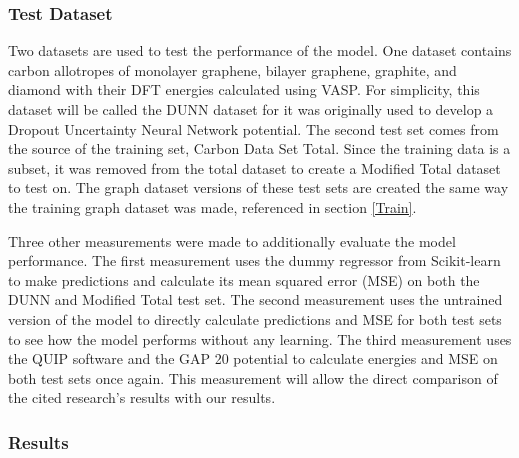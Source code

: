 \documentclass[12pt, abstract = true]{scrartcl}
\begin{document}
\subsubsection{Test Dataset} 
Two datasets are used to test the performance of the model. One dataset contains carbon allotropes of monolayer graphene, bilayer graphene, graphite, and diamond with their DFT energies calculated using VASP. For simplicity, this dataset will be called the DUNN dataset for it was originally used to develop a Dropout Uncertainty Neural Network potential\cite{dunn}. The second test set comes from the source of the training set, Carbon Data Set Total. Since the training data is a subset, it was removed from the total dataset to create a Modified Total dataset to test on. The graph dataset versions of these test sets are created the same way the training graph dataset was made, referenced in section \ref{Train}. 

Three other measurements were made to additionally evaluate the model performance. The first measurement uses the dummy regressor from Scikit-learn to make predictions and calculate its mean squared error (MSE) on both the DUNN and Modified Total test set. The second measurement uses the untrained version of the model to directly calculate predictions and MSE for both test sets to see how the model performs without any learning. The third measurement uses the QUIP software and the GAP 20 potential\cite{gap20} to calculate energies and MSE on both test sets once again. This measurement will allow the direct comparison of the cited research's results with our results.

\subsubsection{Results} 
\end{document}
